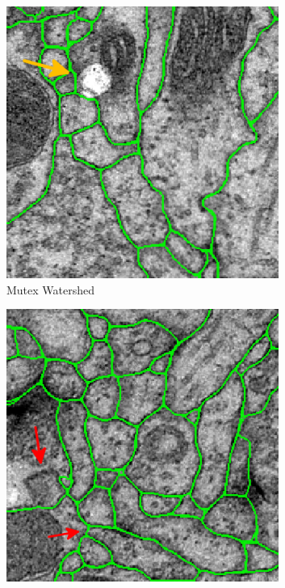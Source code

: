 \begin{figure}
\begin{subfigure}[t]{0.46 \linewidth}
        \includegraphics[width=0.98\textwidth]{figures/MWS/images/damws_1.png}
        \caption{Mutex Watershed} \label{fig:mws2}
    \end{subfigure}
    \vspace{0.3cm}
    \begin{subfigure}[t]{0.46 \linewidth}
        \centering
        \includegraphics[width=0.98\textwidth]{figures/MWS/images/mclr_2.png}

\end{subfigure}
\end{figure}
